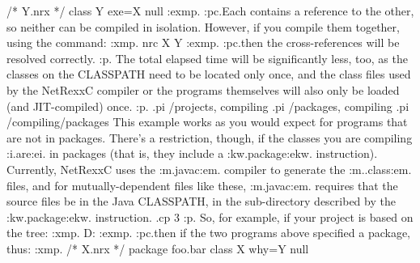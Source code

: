 /* Y.nrx */
class Y
  exe=X null
:exmp.
:pc.Each contains a reference to the other, so neither can be compiled in
isolation.  However, if you compile them together, using the command:
:xmp.
nrc X Y
:exmp.
:pc.then the cross-references will be resolved correctly.
:p.
The total elapsed time will be significantly less, too, as the classes
on the CLASSPATH need to be located only once, and the class files used
by the NetRexxC compiler or the programs themselves will also only be
loaded (and JIT-compiled) once.
:p.
.pi /projects, compiling
.pi /packages, compiling
.pi /compiling/packages
This example works as you would expect for programs that are not in
packages.  There's a restriction, though, if the classes you are
compiling :i.are:ei. in packages (that is, they include a
:kw.package:ekw. instruction).  Currently, NetRexxC uses the :m.javac:em.
compiler to generate the :m..class:em. files, and for mutually-dependent
files like these, :m.javac:em. requires that the source files be in the
Java CLASSPATH, in the sub-directory described by the :kw.package:ekw.
instruction.
.cp 3
:p.
So, for example, if your project is based on the tree:
:xmp.
D:\myproject
:exmp.
:pc.then if the two programs above specified a package, thus:
:xmp.
/* X.nrx */
package foo.bar
class X
  why=Y null

